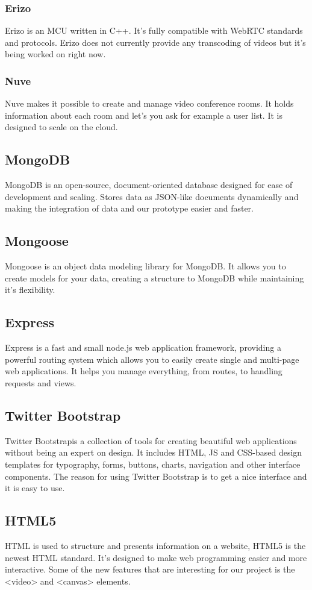 \documentclass[12pt, titlepage]{article}
\begin{document}
\subsubsection{Erizo}
Erizo is an MCU written in C++. It's fully compatible with WebRTC standards and protocols. Erizo does not currently provide any transcoding of videos but it's being worked on right now. 
\subsubsection{Nuve}
Nuve makes it possible to create and manage video conference rooms. It holds information about each room and let's you ask for example a user list. It is designed to scale on the cloud.
\subsection{MongoDB}
MongoDB\cite{29} is an open-source, document-oriented database designed for ease of development and scaling. Stores data as JSON-like documents dynamically and making the integration of data and our prototype easier and faster.
\subsection{Mongoose}
Mongoose\cite{30} is an object data modeling library for MongoDB. It allows you to create models for your data, creating a structure to MongoDB while maintaining it's flexibility.
\subsection{Express}
Express\cite{31} is a fast and small node.js web application framework, providing a powerful routing system which allows you to easily create single and multi-page web applications. It helps you manage everything, from routes, to handling requests and views.
\subsection{Twitter Bootstrap}
Twitter Bootstrap\cite{32}is a collection of tools for creating beautiful web applications without being an expert on design. It includes HTML, JS and CSS-based design templates for typography, forms, buttons, charts, navigation and other interface components. The reason for using Twitter Bootstrap is to get a nice interface and it is easy to use.
\subsection{HTML5}
HTML is used to structure and presents information on a website, HTML5 is the newest HTML standard. It's designed to make web programming easier and more interactive. Some of the new features that are interesting for our project is the <video> and <canvas> elements.
\end{document}
